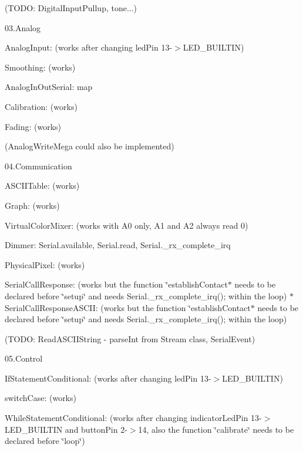 \begin{DoxyItemize}
\begin{DoxyItemize}
\begin{DoxyItemize}
\item (T\-O\-D\-O\-: Digital\-Input\-Pullup, tone...)
\end{DoxyItemize}
\item 03.\-Analog
\begin{DoxyItemize}
\item Analog\-Input\-: (works after changing led\-Pin 13-\/$>$L\-E\-D\-\_\-\-B\-U\-I\-L\-T\-I\-N)
\item Smoothing\-: (works)
\item Analog\-In\-Out\-Serial\-: map
\item Calibration\-: (works)
\item Fading\-: (works)
\item (Analog\-Write\-Mega could also be implemented)
\end{DoxyItemize}
\item 04.\-Communication
\begin{DoxyItemize}
\item A\-S\-C\-I\-I\-Table\-: (works)
\item Graph\-: (works)
\item Virtual\-Color\-Mixer\-: (works with A0 only, A1 and A2 always read 0)
\item Dimmer\-: Serial.\-available, Serial.\-read, Serial.\-\_\-rx\-\_\-complete\-\_\-irq
\item Physical\-Pixel\-: (works)
\item Serial\-Call\-Response\-: (works but the function \char`\"{}establish\-Contact$\ast$ needs to be declared before \char`\"{}setup\char`\"{} and needs Serial.\-\_\-rx\-\_\-complete\-\_\-irq(); within the loop)
    $\ast$ Serial\-Call\-Response\-A\-S\-C\-I\-I\-: (works but the function \char`\"{}establish\-Contact$\ast$ needs to be declared before \char`\"{}setup\char`\"{} and needs Serial.\-\_\-rx\-\_\-complete\-\_\-irq(); within the loop)
\item (T\-O\-D\-O\-: Read\-A\-S\-C\-I\-I\-String -\/ parse\-Int from Stream class, Serial\-Event)
\end{DoxyItemize}
\item 05.\-Control
\begin{DoxyItemize}
\item If\-Statement\-Conditional\-: (works after changing led\-Pin 13-\/$>$L\-E\-D\-\_\-\-B\-U\-I\-L\-T\-I\-N)
\item switch\-Case\-: (works)
\item While\-Statement\-Conditional\-: (works after changing indicator\-Led\-Pin 13-\/$>$L\-E\-D\-\_\-\-B\-U\-I\-L\-T\-I\-N and button\-Pin 2-\/$>$14, also the function \char`\"{}calibrate\char`\"{} needs to be declared before \char`\"{}loop\char`\"{})

\end{DoxyItemize}
\end{DoxyItemize}
\end{DoxyItemize}
